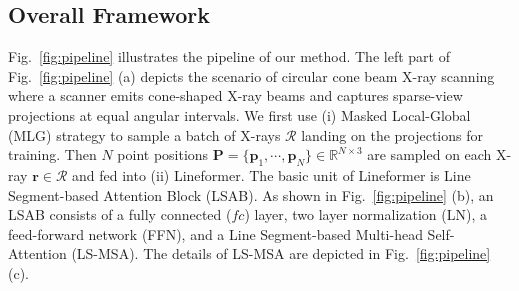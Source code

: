 \documentclass[10pt,twocolumn,letterpaper]{article}
\begin{document}
\subsection{Overall Framework}
Fig.~\ref{fig:pipeline} illustrates the pipeline of our method. The left part of  Fig.~\ref{fig:pipeline} (a) depicts the scenario of circular cone beam X-ray scanning where a scanner emits cone-shaped X-ray beams and captures sparse-view projections at equal angular intervals. We first use (i) Masked Local-Global (MLG) strategy to sample a batch of X-rays  $\mathcal{R}$ landing on the projections for training. Then $N$ point positions $\mathbf{P} = \{\mathbf{p}_1, \cdots, \mathbf{p}_N\} \in \mathbb{R}^{N\times 3}$ are sampled on each X-ray $\mathbf{r} \in \mathcal{R}$ and fed into (ii) Lineformer. The basic unit of Lineformer is Line Segment-based  Attention Block (LSAB). As shown in Fig.~\ref{fig:pipeline} (b), an LSAB consists of a fully connected ($fc$) layer, two layer normalization (LN), a feed-forward network (FFN), and a Line Segment-based Multi-head Self-Attention (LS-MSA). The details of LS-MSA are depicted in Fig.~\ref{fig:pipeline} (c). 
\end{document}
